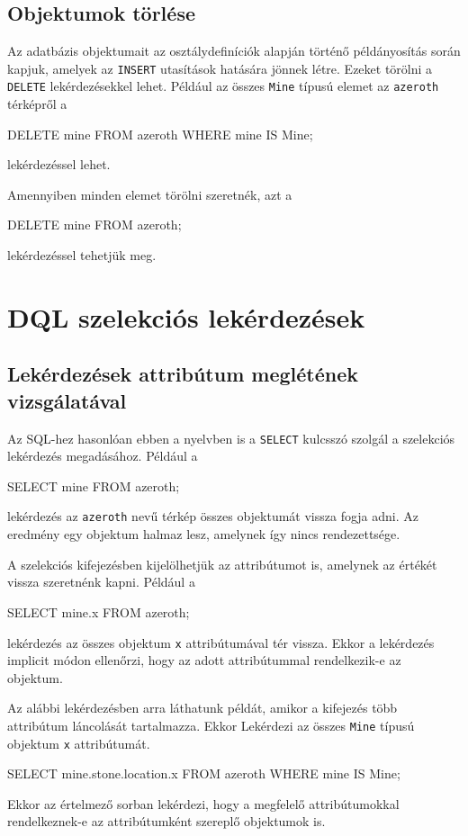 \subsection{Objektumok törlése}

Az adatbázis objektumait az osztálydefiníciók alapján történő példányosítás során kapjuk, amelyek az \texttt{INSERT} utasítások hatására jönnek létre. Ezeket törölni a \texttt{DELETE} lekérdezésekkel lehet. Például az összes \texttt{Mine} típusú elemet az \texttt{azeroth} térképről a
\begin{sql}
DELETE mine FROM azeroth WHERE  mine IS Mine;
\end{sql}
lekérdezéssel lehet.

Amennyiben minden elemet törölni szeretnék, azt a
\begin{sql}
DELETE mine FROM azeroth;
\end{sql}
lekérdezéssel tehetjük meg.

\section{DQL szelekciós lekérdezések}

\subsection{Lekérdezések attribútum meglétének vizsgálatával}

Az SQL-hez hasonlóan ebben a nyelvben is a \texttt{SELECT} kulcsszó szolgál a szelekciós lekérdezés megadásához. Például a
\begin{sql}
SELECT mine FROM azeroth;
\end{sql}
lekérdezés az \texttt{azeroth} nevű térkép összes objektumát vissza fogja adni. Az eredmény egy objektum halmaz lesz, amelynek így nincs rendezettsége.

A szelekciós kifejezésben kijelölhetjük az attribútumot is, amelynek az értékét vissza szeretnénk kapni. Például a
\begin{sql}
SELECT mine.x FROM azeroth;
\end{sql}
lekérdezés az összes objektum \texttt{x} attribútumával tér vissza. Ekkor a lekérdezés implicit módon ellenőrzi, hogy az adott attribútummal rendelkezik-e az objektum.

Az alábbi lekérdezésben arra láthatunk példát, amikor a kifejezés több attribútum láncolását tartalmazza. Ekkor Lekérdezi az összes \texttt{Mine} típusú objektum \texttt{x} attribútumát.
\begin{sql}
SELECT mine.stone.location.x FROM azeroth WHERE mine IS Mine;
\end{sql}
Ekkor az értelmező sorban lekérdezi, hogy a megfelelő attribútumokkal rendelkeznek-e az attribútumként szereplő objektumok is.

